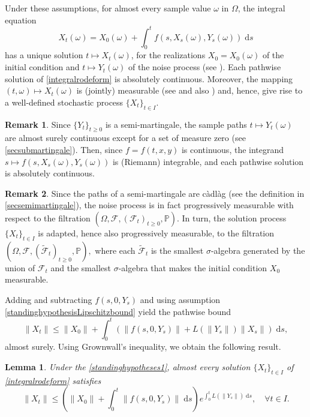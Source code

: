 \documentclass[reqno,12pt]{amsart}
\theoremstyle{plain} %
\newtheorem{lemma}{Lemma}[section]
\theoremstyle{definition} %
\newtheorem{remark}{Remark}[section]
\begin{document}
Under these assumptions, for almost every sample value $\omega$ in $\Omega$, the integral equation
\begin{equation}
    \label{integralrodeform}
    X_t(\omega) = X_0(\omega) + \int_0^t f(s, X_s(\omega), Y_s(\omega)) \;\mathrm{d}s
\end{equation}
has a unique solution $t\mapsto X_t(\omega)$, for the realizations $X_0 = X_0(\omega)$ of the initial condition and $t\mapsto Y_t(\omega)$ of the noise process (see \cite[Theorem 1.1]{CoddingtonLevinson1985}). Each pathwise solution of \cref{integralrodeform} is absolutely continuous. Moreover, the mapping $(t, \omega) \mapsto X_t(\omega)$ is (jointly) measurable (see \cite[Section 2.1.2]{HanKloeden2017} and also \cite[Lemma 4.51]{AB2006}) and, hence, give rise to a well-defined stochastic process $\{X_t\}_{t\in I}.$

\begin{remark}
    Since $\{Y_t\}_{t\geq 0}$ is a semi-martingale, the sample paths $t \mapsto Y_t(\omega)$ are almost surely continuous except for a set of measure zero (see \cref{secsubmartingale}). Then, since $f=f(t, x, y)$ is continuous, the integrand $s \mapsto f(s, X_s(\omega), Y_s(\omega))$ is (Riemann) integrable, and each pathwise solution is absolutely continuous.
\end{remark}

\begin{remark}
    Since the paths of a semi-martingale are c\`adl\`ag (see the definition in \cref{secsemimartingale}), the noise process is in fact progressively measurable with respect to the filtration $(\Omega, \mathcal{F}, (\mathcal{F}_t)_{t\geq 0}, \mathbb{P}).$ In turn, the solution process $\{X_t\}_{t\in I}$ is adapted, hence also progressively measurable, to the filtration $(\Omega, \mathcal{F}, (\tilde{\mathcal{F}}_t)_{t\geq 0}, \mathbb{P}),$ where each $\tilde{\mathcal{F}}_t$ is the smallest $\sigma$-algebra generated by the union of $\mathcal{F}_t$ and the smallest $\sigma$-algebra that makes the initial condition $X_0$ measurable.
\end{remark}

Adding and subtracting $f(s, 0, Y_s)$ and using assumption \cref{standinghypothesisLipschitzbound} yield the pathwise bound
\[
    \|X_t\| \leq \|X_0\| + \int_0^t \left(\|f(s, 0, Y_s)\| + L(\|Y_s\|)\|X_s\|\right)\;\mathrm{d}s,
\]
almost surely. Using Grownwall's inequality, we obtain the following result.
\begin{lemma}
    Under the \cref{standinghypotheses1}, almost every solution $\{X_t\}_{t\in I}$ of \cref{integralrodeform} satisfies
    \begin{equation}
        \label{XtboundLXMt}
        \|X_t\| \leq \left(\|X_0\| + \int_0^t \|f(s, 0, Y_s)\|\;\mathrm{d}s\right) e^{\int_0^t L(\|Y_s\|)\;\mathrm{d}s}, \quad \forall t\in I.
    \end{equation}
\end{lemma}
\end{document}
